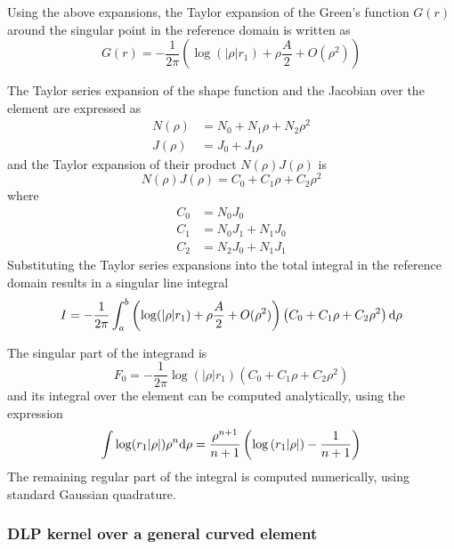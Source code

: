 Using the above expansions, the Taylor expansion of the Green's function $G(r)$ around the singular point in the reference domain is written as
%
\begin{equation}
	G(r) = -\frac{1}{2\pi} \left(
		\log (|\rho| r_1) + \rho \frac{A}{2} + O(\rho^2)
		\right)
\end{equation}


The Taylor series expansion of the shape function and the Jacobian over the element are expressed as
%
\begin{align}
	N(\rho) &= N_0 + N_1 \rho + N_2 \rho^2 \\
	J(\rho) &= J_0 + J_1 \rho
\end{align}
%
and the Taylor expansion of their product $N(\rho) J(\rho)$ is
%
\begin{equation}
	N(\rho) J(\rho) = C_0 + C_1 \rho + C_2 \rho^2
\end{equation}
%
where
%
\begin{align}
	C_0 &= N_0 J_0 \\
	C_1 &= N_0 J_1 + N_1 J_0 \\
	C_2 &= N_2 J_0 + N_1 J_1
\end{align}
%
Substituting the Taylor series expansions into the total integral in the reference domain results in a singular line integral
%
\begin{equation}
	I = -\frac{1}{2\pi} \int_{a}^{b}
	 \left(
		\log (|\rho| r_1) + \rho \frac{A}{2} + O(\rho^2)
	\right)
	\left( C_0 + C_1 \rho + C_2 \rho^2 \right) \mathrm{d}\rho
\end{equation}

The singular part of the integrand is
%
\begin{equation}
	F_0 = -\frac{1}{2\pi} \log \left(|\rho| r_1\right) \left( C_0 + C_1 \rho + C_2 \rho^2 \right)
\end{equation}
%
and its integral over the element can be computed analytically, using the expression
%
\begin{equation}
	\int \log(r_1 |\rho|) \rho^n \mathrm{d} \rho = \frac{\rho^{n+1}}{n+1} \left( \log\left(r_1 |\rho|\right) - \frac{1}{n+1} \right)
\end{equation}
The remaining regular part of the integral is computed numerically, using standard Gaussian quadrature.


\subsubsection{DLP kernel over a general curved element}

